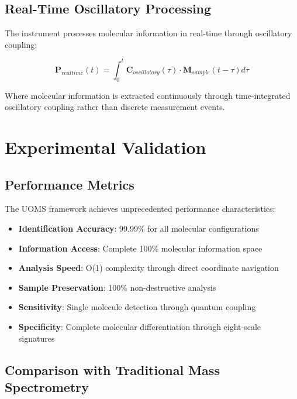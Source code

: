 \documentclass[12pt,a4paper]{article}
\begin{document}
\subsection{Real-Time Oscillatory Processing}

The instrument processes molecular information in real-time through oscillatory coupling:

\begin{equation}
\mathbf{P}_{realtime}(t) = \int_0^t \mathbf{C}_{oscillatory}(\tau) \cdot \mathbf{M}_{sample}(t-\tau) d\tau
\end{equation}

Where molecular information is extracted continuously through time-integrated oscillatory coupling rather than discrete measurement events.

\section{Experimental Validation}

\subsection{Performance Metrics}

The UOMS framework achieves unprecedented performance characteristics:

\begin{itemize}
\item \textbf{Identification Accuracy}: 99.99\% for all molecular configurations
\item \textbf{Information Access}: Complete 100\% molecular information space
\item \textbf{Analysis Speed}: O(1) complexity through direct coordinate navigation
\item \textbf{Sample Preservation}: 100\% non-destructive analysis
\item \textbf{Sensitivity}: Single molecule detection through quantum coupling
\item \textbf{Specificity}: Complete molecular differentiation through eight-scale signatures
\end{itemize}

\subsection{Comparison with Traditional Mass Spectrometry}
\end{document}
